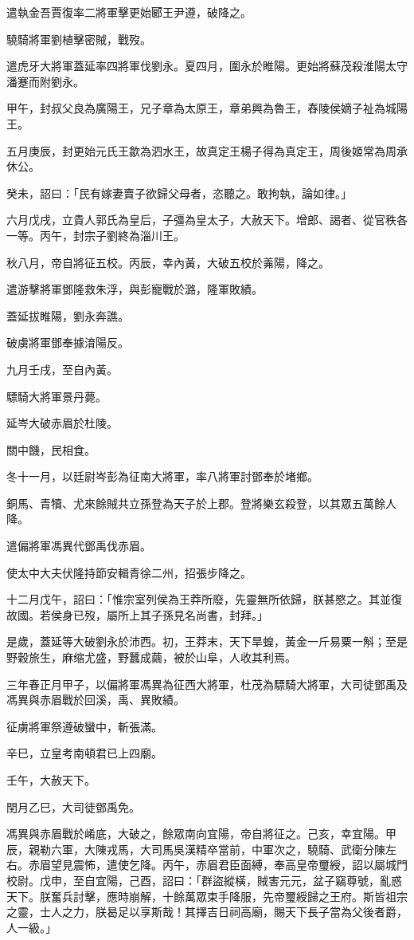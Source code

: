 \begin{pinyinscope}
遣執金吾賈復率二將軍擊更始郾王尹遵，破降之。

驍騎將軍劉植擊密賊，戰歿。

遣虎牙大將軍蓋延率四將軍伐劉永。夏四月，圍永於睢陽。更始將蘇茂殺淮陽太守潘蹇而附劉永。

甲午，封叔父良為廣陽王，兄子章為太原王，章弟興為魯王，舂陵侯嫡子祉為城陽王。

五月庚辰，封更始元氏王歙為泗水王，故真定王楊子得為真定王，周後姬常為周承休公。

癸未，詔曰：「民有嫁妻賣子欲歸父母者，恣聽之。敢拘執，論如律。」

六月戊戌，立貴人郭氏為皇后，子彊為皇太子，大赦天下。增郎、謁者、從官秩各一等。丙午，封宗子劉終為淄川王。

秋八月，帝自將征五校。丙辰，幸內黃，大破五校於羛陽，降之。

遣游擊將軍鄧隆救朱浮，與彭寵戰於潞，隆軍敗績。

蓋延拔睢陽，劉永奔譙。

破虜將軍鄧奉據淯陽反。

九月壬戌，至自內黃。

驃騎大將軍景丹薨。

延岑大破赤眉於杜陵。

關中饑，民相食。

冬十一月，以廷尉岑彭為征南大將軍，率八將軍討鄧奉於堵鄉。

銅馬、青犢、尤來餘賊共立孫登為天子於上郡。登將樂玄殺登，以其眾五萬餘人降。

遣偏將軍馮異代鄧禹伐赤眉。

使太中大夫伏隆持節安輯青徐二州，招張步降之。

十二月戊午，詔曰：「惟宗室列侯為王莽所廢，先靈無所依歸，朕甚愍之。其並復故國。若侯身已歿，屬所上其子孫見名尚書，封拜。」

是歲，蓋延等大破劉永於沛西。初，王莽末，天下旱蝗，黃金一斤易粟一斛；至是野穀旅生，麻缩尤盛，野蠶成繭，被於山阜，人收其利焉。

三年春正月甲子，以偏將軍馮異為征西大將軍，杜茂為驃騎大將軍，大司徒鄧禹及馮異與赤眉戰於回溪，禹、異敗績。

征虜將軍祭遵破蠻中，斬張滿。

辛巳，立皇考南頓君已上四廟。

壬午，大赦天下。

閏月乙巳，大司徒鄧禹免。

馮異與赤眉戰於崤底，大破之，餘眾南向宜陽，帝自將征之。己亥，幸宜陽。甲辰，親勒六軍，大陳戎馬，大司馬吳漢精卒當前，中軍次之，驍騎、武衛分陳左右。赤眉望見震怖，遣使乞降。丙午，赤眉君臣面縛，奉高皇帝璽綬，詔以屬城門校尉。戊申，至自宜陽，己酉，詔曰：「群盜縱橫，賊害元元，盆子竊尊號，亂惑天下。朕奮兵討擊，應時崩解，十餘萬眾束手降服，先帝璽綬歸之王府。斯皆祖宗之靈，士人之力，朕曷足以享斯哉！其擇吉日祠高廟，賜天下長子當為父後者爵，人一級。」


\end{pinyinscope}
